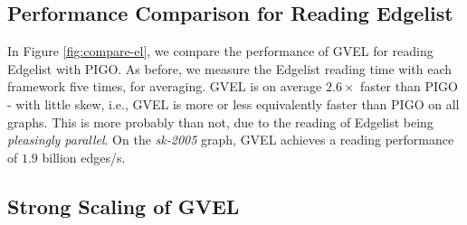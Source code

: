 % 






\subsection{Performance Comparison for Reading Edgelist}

In Figure \ref{fig:compare-el}, we compare the performance of GVEL for reading Edgelist with PIGO. As before, we measure the Edgelist reading time with each framework five times, for averaging. GVEL is on average $2.6\times$ faster than PIGO - with little skew, i.e., GVEL is more or less equivalently faster than PIGO on all graphs. This is more probably than not, due to the reading of Edgelist being \textit{pleasingly parallel}. On the \textit{sk-2005} graph, GVEL achieves a reading performance of $1.9$ billion edges/s.




\subsection{Strong Scaling of GVEL}

